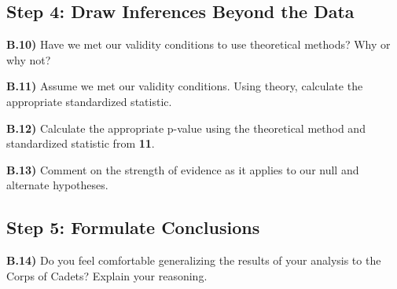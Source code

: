\documentclass{article}
\newif\ifPrintSolution
\newcommand{\sol}[1]{\ifPrintSolution {\color{blue} #1 } \fi}
\begin{document}
\sol{From the code above, we find that 
mean = $\bar{x}$ = 829\\
median = 824 \\
standard deviation = \textit{s} = 83.9\\
sample size = \textit{n} = 293}

\vspace{0.25 in}

\subsection*{Step 4: Draw Inferences Beyond the Data}

\textbf{B.10)} Have we met our validity conditions to use theoretical methods? Why or why not?

\sol{Yes, for quantitative data we have more than 20 observations and the data is not strongly skewed.}

\vspace{0.25in}

\textbf{B.11)} Assume we met our validity conditions. Using theory, calculate the appropriate standardized statistic.

\sol{ $t = \frac{824 - 800}{\frac{83.9}{\sqrt{293}}}$ = 4.89647}

\vspace{0.35in}

\textbf{B.12)} Calculate the appropriate p-value using the theoretical method and standardized statistic from \textbf{11}.

\sol{$2*(1 - pt(abs(4.89647), 292)) = 1.617708e^{-6}$}

\vspace{0.35in}

\textbf{B.13)} Comment on the strength of evidence as it applies to our null and alternate hypotheses.

\sol{ With a p-value of 0.000006, we have very strong evidence that the true mean of corps of cadets IOCT scores is not equal to 800.}

\vspace{0.251in}

\subsection*{Step 5: Formulate Conclusions}

\vspace{0.25in}

\textbf{B.14)} Do you feel comfortable generalizing the results of your analysis to the Corps of Cadets? Explain your reasoning.
\end{document}
